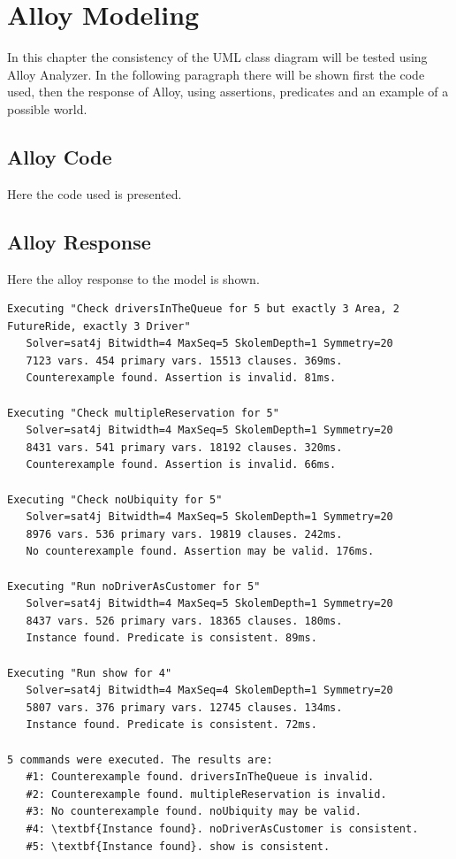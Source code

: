 \chapter{Alloy Modeling}
\label{alloy}

In this chapter the consistency of the UML class diagram will be tested using Alloy Analyzer. In the following paragraph there will be shown first the code used, then the response of Alloy, using assertions, predicates and an example of a possible world.

\section{Alloy Code}
Here the code used is presented.



\clearpage

\section{Alloy Response}
Here the alloy response to the model is shown.
\begin{Verbatim}[commandchars=\\\{\},codes={\catcode`$=3\catcode`_=8}]
Executing "Check driversInTheQueue for 5 but exactly 3 Area, 2 FutureRide, exactly 3 Driver"
   Solver=sat4j Bitwidth=4 MaxSeq=5 SkolemDepth=1 Symmetry=20
   7123 vars. 454 primary vars. 15513 clauses. 369ms.
   Counterexample found. Assertion is invalid. 81ms.

Executing "Check multipleReservation for 5"
   Solver=sat4j Bitwidth=4 MaxSeq=5 SkolemDepth=1 Symmetry=20
   8431 vars. 541 primary vars. 18192 clauses. 320ms.
   Counterexample found. Assertion is invalid. 66ms.

Executing "Check noUbiquity for 5"
   Solver=sat4j Bitwidth=4 MaxSeq=5 SkolemDepth=1 Symmetry=20
   8976 vars. 536 primary vars. 19819 clauses. 242ms.
   No counterexample found. Assertion may be valid. 176ms.

Executing "Run noDriverAsCustomer for 5"
   Solver=sat4j Bitwidth=4 MaxSeq=5 SkolemDepth=1 Symmetry=20
   8437 vars. 526 primary vars. 18365 clauses. 180ms.
   Instance found. Predicate is consistent. 89ms.

Executing "Run show for 4"
   Solver=sat4j Bitwidth=4 MaxSeq=4 SkolemDepth=1 Symmetry=20
   5807 vars. 376 primary vars. 12745 clauses. 134ms.
   Instance found. Predicate is consistent. 72ms.

5 commands were executed. The results are:
   #1: Counterexample found. driversInTheQueue is invalid.
   #2: Counterexample found. multipleReservation is invalid.
   #3: No counterexample found. noUbiquity may be valid.
   #4: \textbf{Instance found}. noDriverAsCustomer is consistent.
   #5: \textbf{Instance found}. show is consistent.
\end{Verbatim}

